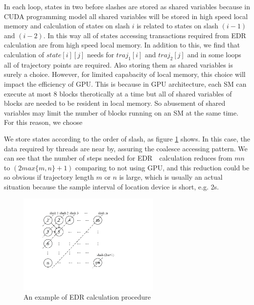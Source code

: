\documentclass[conference]{IEEEtran}
\begin{document}
In each loop, states in two before slashes are stored as shared variables because in CUDA programming model all shared variables will be stored in high speed local memory and calculation of states on slash $i$ is related to states on slash $(i-1)$ and $(i-2)$. In this way all of states accessing transactions required from EDR calculation are from high speed local memory. In addition to this, we find that calculation of $state[i][j]$ needs for $traj_1[i]$ and $traj_2[j]$ and in some loops all of trajectory points are required. Also storing them as shared variables is surely a choice. However, for limited capabacity of local memory, this choice will impact the efficiency of GPU. This is because in GPU architecture, each SM can execute at most 8 blocks therotically at a time but all of shared variables of blocks are needed to be resident in local memory. So abusement of shared variables may limit the number of blocks running on an SM at the same time. For this reason, we choose 

We store states according to the order of slash, as figure \ref{fig:DPstate} shows. In this case, the data required by threads are near by, assuring the coalesce accessing pattern. We can see that the number of steps needed for EDR　calculation reduces from $mn$ to $(2max\{m,n\}+1)$ comparing to not using GPU, and this reduction could be so obvious if trajectory length $m$ or $n$ is large, which is usually an actual situation because the sample interval of location device is short, e.g. 2s.

\begin{figure}[!t]\centering
	\includegraphics[width=7cm]{pdf/DPstate.pdf}
	\caption{An example of EDR calculation procedure\label{fig:DPstate}}
\end{figure}
\end{document}
